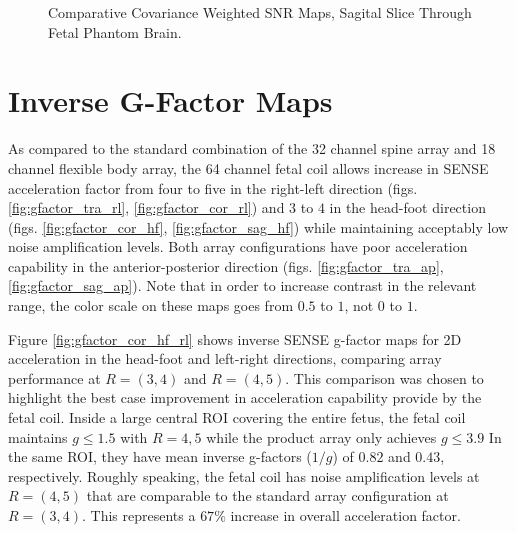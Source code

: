 \begin{figure}
\caption{Comparative Covariance Weighted SNR Maps, Sagital Slice Through Fetal Phantom Brain.}
\label{fig:SNR_sag}
\end{figure}

\section{Inverse G-Factor Maps}
As compared to the standard combination of the 32 channel spine array and 18 channel flexible body array, the 64 channel
fetal coil allows increase in SENSE acceleration factor from four to five in the right-left direction (figs.
\ref{fig:gfactor_tra_rl}, \ref{fig:gfactor_cor_rl}) and $3$ to $4$ in the head-foot direction (figs.
\ref{fig:gfactor_cor_hf}, \ref{fig:gfactor_sag_hf}) while maintaining acceptably low noise amplification levels. Both
array configurations have poor acceleration capability in the anterior-posterior direction (figs.
\ref{fig:gfactor_tra_ap}, \ref{fig:gfactor_sag_ap}). Note that in order to increase contrast in the relevant range, the
color scale on these maps goes from $0.5$ to $1$, not $0$ to $1$.

Figure \ref{fig:gfactor_cor_hf_rl} shows inverse SENSE g-factor maps for 2D acceleration in the head-foot and left-right
directions, comparing array performance at $R=(3,4)$ and $R=(4,5)$. This comparison was chosen to highlight the best
case improvement in acceleration capability provide by the fetal coil. Inside a large central ROI covering the entire
fetus, the fetal coil maintains $g\le1.5$ with $R=4,5$ while the product array only achieves $g\le3.9$ In the same ROI,
they have mean inverse g-factors ($1/g$) of $0.82$ and $0.43$, respectively. Roughly speaking, the fetal coil has noise
amplification levels at $R=(4,5)$ that are comparable to the standard array configuration at $R=(3,4)$. This represents
a $67\%$ increase in overall acceleration factor.


